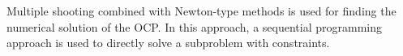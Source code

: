 


Multiple shooting combined with Newton-type methods is used for finding the numerical solution of the OCP. In this approach, a sequential programming approach is used to directly solve a subproblem with constraints. 




